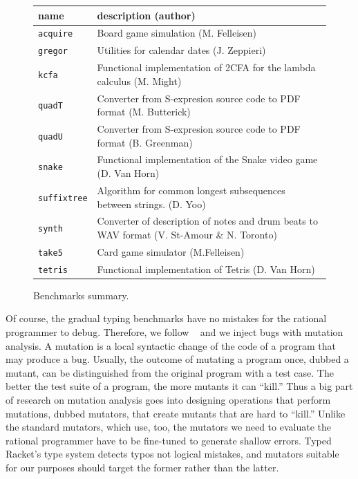 \begin{figure}
\begin{tabular}{p{2cm} | p{10cm} }
  {\bf  name} & {\bf description (author)}  \\

\hline

  \texttt{acquire} & Board game simulation (M. Felleisen)  \\%


\hline
  \texttt{gregor} & Utilities for calendar dates (J. Zeppieri) \\%


\hline
  \texttt{kcfa} & Functional implementation of 2CFA for the lambda calculus (M. Might) \\%


\hline
  \texttt{quadT} & Converter from S-expresion source code to PDF format (M. Butterick)\\%

\hline
  \texttt{quadU} & Converter from S-expresion source code to PDF format  (B. Greenman) \\%

\hline
  \texttt{snake} & Functional implementation of the  Snake video game (D. Van Horn) \\%

\hline
  \texttt{suffixtree} & Algorithm for common longest subsequences between strings. (D. Yoo) \\%

\hline
  \texttt{synth} & Converter of description of notes and drum beats to WAV format (V. St-Amour \& N. Toronto) \\%

\hline
  \texttt{take5} & Card game simulator (M.Felleisen)  \\%

\hline
  \texttt{tetris} & Functional implementation of Tetris (D. Van Horn) \\%


\end{tabular}
  \caption{Benchmarks summary.}
  \label{table:benchmark-descriptions}
\end{figure}

Of course, the gradual typing benchmarks have no mistakes for the rational
programmer to debug. Therefore, we follow
~\citet{lksfd-popl-2020} and we inject bugs with mutation analysis.
A mutation is a local syntactic change of the code of a program that may
produce a bug.
Usually, the outcome of mutating a program
once, dubbed a mutant, can be distinguished from the original program with a test case.
The better the test suite of a program, the more mutants it can ``kill.''
Thus a big part of research on mutation analysis goes into designing
operations that perform mutations, dubbed mutators, that create mutants
that are hard to ``kill.'' Unlike the standard mutators, which \citet{lksfd-popl-2020}
use, too, the mutators we need to evaluate the rational programmer have to be
fine-tuned to generate shallow errors. Typed Racket's type system detects
typos not logical mistakes, and mutators suitable for our purposes
should target the former rather than the latter.

